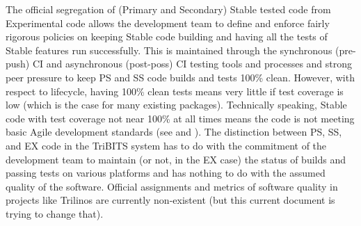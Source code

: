 \documentclass[11pt]{SANDreport}
\begin{document}
The official segregation of (Primary and Secondary) Stable tested code
from Experimental code allows the development team to define and
enforce fairly rigorous policies on keeping Stable code building and
having all the tests of Stable features run successfully.  This is
maintained through the synchronous (pre-push) CI and asynchronous
(post-poss) CI testing tools and processes and strong peer pressure to
keep PS and SS code builds and tests 100\% clean.  However, with
respect to lifecycle, having 100\% clean tests means very little if
test coverage is low (which is the case for many existing packages).
Technically speaking, Stable code with test coverage not near 100\% at
all times means the code is not meeting basic Agile development
standards (see {}\cite{XP2} and {}\cite{CodeComplete2nd04}).  The
distinction between PS, SS, and EX code in the TriBITS system has to
do with the commitment of the development team to maintain (or not, in
the EX case) the status of builds and passing tests on various
platforms and has nothing to do with the assumed quality of the
software.  Official assignments and metrics of software quality in
projects like Trilinos are currently non-existent (but this current
document is trying to change that).

\begin{figure}
\begin{center}
\end{center}
\end{figure}
\end{document}
